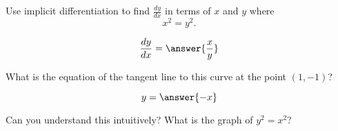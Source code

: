 \documentclass{ximera}
\author{Steven Gubkin}
\begin{document}
\begin{exercise}

Use implicit differentiation to find $\frac{dy}{dx}$ in terms  of $x$ and $y$ where
\[
x^2 = y^2.
\]
\begin{prompt}
\[
\frac{dy}{dx} = \answer{\frac{x}{y}}
\]
\end{prompt}
What is the equation of the tangent line to this curve at the point $(1,-1)$?
\begin{prompt}
\[
y = \answer{-x}
\]
\end{prompt}
Can you understand this intuitively?  What is the graph of $y^2 = x^2$?
\end{exercise}
\end{document}

